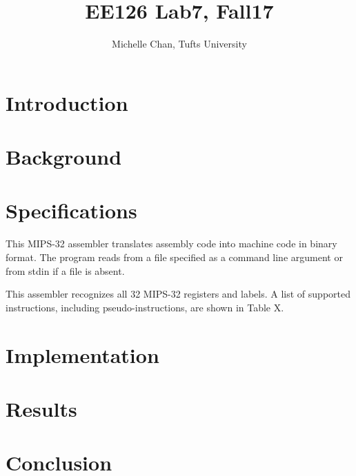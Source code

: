 \documentclass[titlepage]{article}
\title{EE126 Lab7, Fall17}
\author{Michelle Chan, Tufts University}
\begin{document}
\begin{titlepage}
\maketitle
\end{titlepage}

\section*{Introduction}


\section*{Background}

\section*{Specifications}

This MIPS-32 assembler translates assembly code into machine code in binary
format. The program reads from a file specified as a command line argument
or from stdin if a file is absent. 

This assembler recognizes all 32 MIPS-32 registers and labels. A list of 
supported instructions, including pseudo-instructions, are shown in Table X.



\section*{Implementation}


\section*{Results}



\section*{Conclusion}

\end{document}
